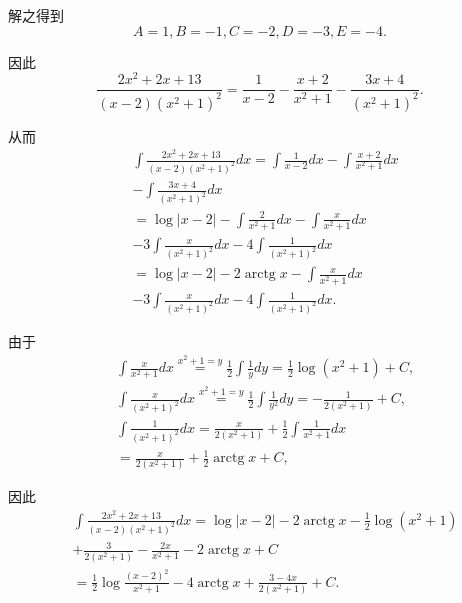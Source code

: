 解之得到
$$A = 1,B =  - 1,C =  - 2,D =  - 3,E =  - 4.$$

因此
$$\frac{2{x}^{2} + {2x} + {13}}{\left( {x - 2}\right) {\left( {x}^{2} + 1\right) }^{2}} = \frac{1}{x - 2} - \frac{x + 2}{{x}^{2} + 1} - \frac{{3x} + 4}{{\left( {x}^{2} + 1\right) }^{2}}.$$

从而
\begin{align*}
	&\int \frac{2{x}^{2} + {2x} + {13}}{\left( {x - 2}\right) {\left( {x}^{2} + 1\right) }^{2}}{dx} = \int \frac{1}{x - 2}{dx} - \int \frac{x + 2}{{x}^{2} + 1}{dx}\\
	&- \int \frac{{3x} + 4}{{\left( {x}^{2} + 1\right) }^{2}}{dx}\\
	&= \log \left| {x - 2}\right|  - \int \frac{2}{{x}^{2} + 1}{dx} - \int \frac{x}{{x}^{2} + 1}{dx}\\
	&- 3\int \frac{x}{{\left( {x}^{2} + 1\right) }^{2}}{dx} - 4\int \frac{1}{{\left( {x}^{2} + 1\right) }^{2}}{dx}\\
	&= \log \left| {x - 2}\right|  - 2\operatorname{arctg}x - \int \frac{x}{{x}^{2} + 1}{dx}\\
	&- 3\int \frac{x}{{\left( {x}^{2} + 1\right) }^{2}}{dx} - 4\int \frac{1}{{\left( {x}^{2} + 1\right) }^{2}}{dx}.
\end{align*}

由于
\begin{align*}
	&\int \frac{x}{{x}^{2} + 1}{dx}\overset{{x}^{2} + 1 = y}{ = }\frac{1}{2}\int \frac{1}{y}{dy} = \frac{1}{2}\log \left( {{x}^{2} + 1}\right)  + C,\\
	&\int \frac{x}{{\left( {x}^{2} + 1\right) }^{2}}{dx}\overset{{x}^{2} + 1 = y}{ = }\frac{1}{2}\int \frac{1}{{y}^{2}}{dy} =  - \frac{1}{2\left( {{x}^{2} + 1}\right) } + C,\\
	&\int \frac{1}{{\left( {x}^{2} + 1\right) }^{2}}{dx} = \frac{x}{2\left( {{x}^{2} + 1}\right) } + \frac{1}{2}\int \frac{1}{{x}^{2} + 1}{dx}\\
	&= \frac{x}{2\left( {{x}^{2} + 1}\right) } + \frac{1}{2}\operatorname{arctg}x + C,
\end{align*}

因此
\begin{align*}
	&\int \frac{2{x}^{2} + {2x} + {13}}{\left( {x - 2}\right) {\left( {x}^{2} + 1\right) }^{2}}{dx} = \log \left| {x - 2}\right|  - 2\operatorname{arctg}x - \frac{1}{2}\log \left( {{x}^{2} + 1}\right)\\
	&+ \frac{3}{2\left( {{x}^{2} + 1}\right) } - \frac{2x}{{x}^{2} + 1} - 2\operatorname{arctg}x + C\\
	&= \frac{1}{2}\log \frac{{\left( x - 2\right) }^{2}}{{x}^{2} + 1} - 4\operatorname{arctg}x + \frac{3 - {4x}}{2\left( {{x}^{2} + 1}\right) } + C.
\end{align*}

